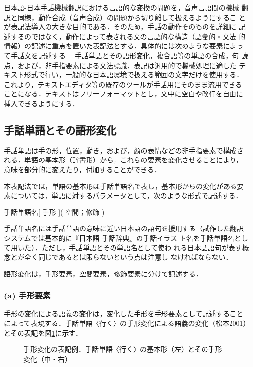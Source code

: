 日本語-日本手話機械翻訳における言語的な変換の問題を，音声言語間の機械
翻訳と同様，動作合成（音声合成）の問題から切り離して扱えるようにするこ
とが表記法導入の大きな目的である．そのため，手話の動作そのものを詳細に
記述するのではなく，動作によって表される文の言語的な構造（語彙的・文法
的情報）の記述に重点を置いた表記法とする．具体的には次のような要素によっ
て手話文を記述する： 手話単語とその語形変化，複合語等の単語の合成，句
読点，および，非手指要素による文法標識．表記は汎用的で機械処理に適した
テキスト形式で行い，一般的な日本語環境で扱える範囲の文字だけを使用する．
これより，テキストエディタ等の既存のツールが手話用にそのまま流用できる
ことになる．テキストはフリーフォーマットとし，文中に空白や改行を自由に
挿入できるようにする．

\subsection{手話単語とその語形変化}
\label{sec:inflection}

手話単語は手の形，位置，動き，および，顔の表情などの非手指要素で構成さ
れる．単語の基本形（辞書形）から，これらの要素を変化させることにより，
意味を部分的に変えたり，付加することができる．

本表記法では，単語の基本形は手話単語名で表し，基本形からの変化がある要
素については，単語に対するパラメータとして，次のような形式で記述する．

\begin{ex}
  手話単語名[ 手形 ]( 空間；修飾 )
\end{ex}

手話単語名には手話単語の意味に近い日本語の語句を援用する（試作した翻訳
システムでは基本的に『日本語-手話辞典』\cite{JISLS1997}の手話イラス
ト名を手話単語名として用いた）．ただし，手話単語とその単語名として使わ
れる日本語語句が表す概念とが全く同じであるとは限らないという点は注意し
なければならない．

語形変化は，手形要素，空間要素，修飾要素に分けて記述する．

\subsubsection*{(a) 手形要素}

手形の変化による語義の変化は，変化した手形を手形要素として記述すること
によって表現する．手話単語〈行く〉の手形変化による語義の変化（松本2001）
とその表記を図\ref{fig:iku}に示す．

\begin{figure}
  \centering
  \epsfxsize=7cm
  \caption{手形変化の表記例．手話単語〈行く〉の基本形（左）とその手形
    変化（中・右）}
  \label{fig:iku}
\end{figure}

